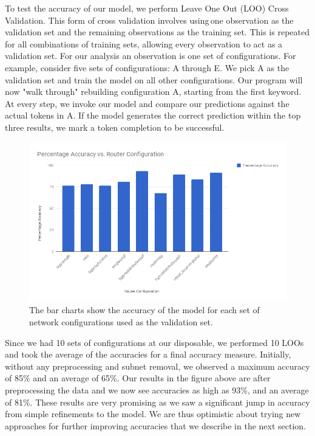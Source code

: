 To test the accuracy of our model, we perform Leave One Out (LOO) Cross Validation. This form of cross validation involves using one observation as the validation set and the remaining observations as the training set. This is repeated for all combinations of training sets, allowing every observation to act as a validation set. For our analysis an observation is one set of configurations. For example, consider five sets of configurations: A through E. We pick A as the validation set and train the model on all other configurations. Our program will now "walk through" rebuilding configuration A, starting from the first keyword. At every step, we invoke our model and compare our predictions against the actual tokens in A. If the model generates the correct prediction within the top three results, we mark a token completion to be successful.\\
 
\begin{figure}[H]
	\centering
	\includegraphics[width=\textwidth]{model_analysis.png}
	\caption{The bar charts show the accuracy of the model for each set of network configurations used as the validation set.}
\end{figure}
Since we had 10 sets of configurations at our disposable, we performed 10 LOOs and took the average of the accuracies for a final accuracy measure. Initially, without any preprocessing and subnet removal, we observed a maximum accuracy of 85\% and an average of 65\%. Our results in the figure above are after preprocessing the data and we now see accuracies as high as 93\%, and an average of 81\%. These results are very promising as we saw a significant jump in accuracy from simple refinements to the model. We are thus optimistic about trying new approaches for further improving accuracies that we describe in the next section.